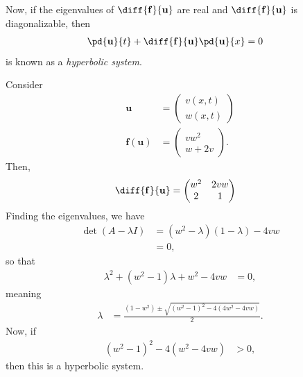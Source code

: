 \documentclass[10pt]{mypackage}
\begin{document}
Now, if the eigenvalues of $\diff{\mathbf{f}}{\mathbf{u}}$ are real and $\diff{\mathbf{f}}{\mathbf{u}}$ is diagonalizable, then
\begin{align*}
  \pd{\mathbf{u}}{t} + \diff{\mathbf{f}}{\mathbf{u}}\pd{\mathbf{u}}{x} &= 0
\end{align*}
is known as a \textit{hyperbolic system}.
\begin{example}
  Consider
  \begin{align*}
    \mathbf{u} &= \begin{pmatrix}v\left( x,t \right)\\ w\left( x,t \right)\end{pmatrix}\\
    \mathbf{f}\left( \mathbf{u} \right) &= \begin{pmatrix}vw^2 \\ w + 2v\end{pmatrix}.
  \end{align*}
  Then,
  \begin{align*}
    \diff{\mathbf{f}}{\mathbf{u}} &= \begin{pmatrix}w^2 & 2vw \\ 2 & 1\end{pmatrix}
  \end{align*}
  Finding the eigenvalues, we have
  \begin{align*}
    \det\left( A - \lambda I \right) &= \left( w^2 -\lambda \right)\left( 1-\lambda \right) - 4vw\\
                                     &= 0,
  \end{align*}
  so that
  \begin{align*}
    \lambda^2 + \left( w^2 - 1 \right)\lambda + w^2 - 4vw &= 0,
  \end{align*}
  meaning
  \begin{align*}
    \lambda &= \frac{\left( 1-w^2 \right)\pm \sqrt{\left( w^2 - 1 \right)^2 - 4\left( 4w^2-4vw \right)}}{2}.
  \end{align*}
  Now, if
  \begin{align*}
    \left( w^2 - 1 \right)^2 - 4\left( w^2 - 4vw \right) &> 0,
  \end{align*}
  then this is a hyperbolic system.
\end{example}
\end{document}
